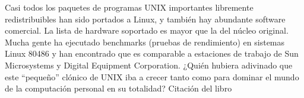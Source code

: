 Casi todos los paquetes de programas UNIX importantes libremente
redistribuibles han sido portados a Linux, y también hay abundante software
comercial. La lista de hardware soportado es mayor que la del núcleo
original. Mucha gente ha ejecutado benchmarks (pruebas de rendimiento)
en sistemas Linux 80486 y han encontrado que es comparable a
estaciones de trabajo de Sun Microsystems y Digital Equipment
Corporation. ¿Quién hubiera adivinado que este ``pequeño'' clónico de
UNIX iba a crecer tanto como para dominar el mundo de la computación
personal en su totalidad? Citación del libro \cite{CLMPS}


